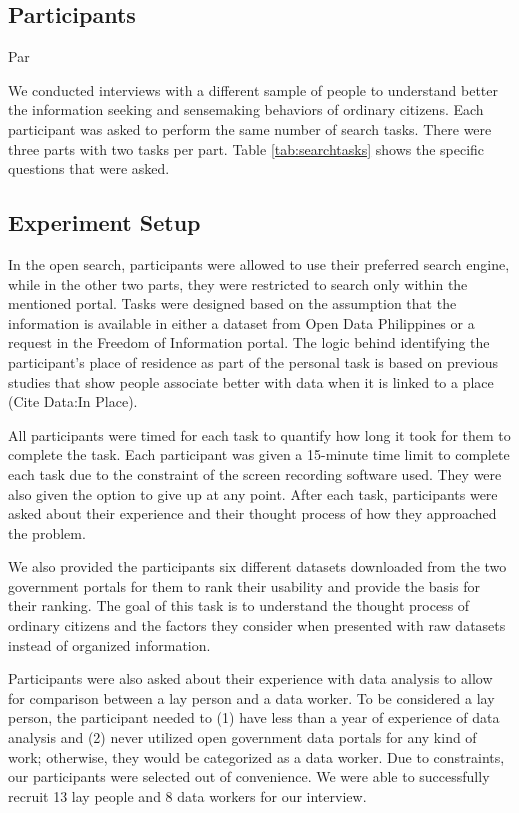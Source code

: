 \documentclass{sigchi}
\begin{document}
\subsection{Participants}
Par

We conducted interviews with a different sample of people to understand better the information seeking and sensemaking behaviors of ordinary citizens. Each participant was asked to perform the same number of search tasks. There were three parts with two tasks per part. Table \ref{tab:searchtasks} shows the specific questions that were asked. 

\subsection{Experiment Setup}
In the open search, participants were allowed to use their preferred search engine, while in the other two parts, they were restricted to search only within the mentioned portal. Tasks were designed based on the assumption that the information is available in either a dataset from Open Data Philippines or a request in the Freedom of Information portal. The logic behind identifying the participant's place of residence as part of the personal task is based on previous studies that show people associate better with data when it is linked to a place (Cite Data:In Place).

All participants were timed for each task to quantify how long it took for them to complete the task. Each participant was given a 15-minute time limit to complete each task due to the constraint of the screen recording software used. They were also given the option to give up at any point. After each task, participants were asked about their experience and their thought process of how they approached the problem.

We also provided the participants six different datasets downloaded from the two government portals for them to rank their usability and provide the basis for their ranking. The goal of this task is to understand the thought process of ordinary citizens and the factors they consider when presented with raw datasets instead of organized information. 

Participants were also asked about their experience with data analysis to allow for comparison between a lay person and a data worker. To be considered a lay person, the participant needed to (1) have less than a year of experience of data analysis and (2) never utilized open government data portals for any kind of work; otherwise, they would be categorized as a data worker. Due to constraints, our participants were selected out of convenience. We were able to successfully recruit 13 lay people and 8 data workers for our interview.
\end{document}
